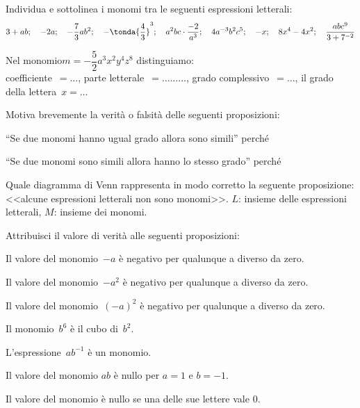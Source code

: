 \begin{esercizio}
\label{ese:9.8}
Individua e sottolinea i monomi tra le seguenti espressioni letterali:
\[3+ab;\quad -2a;\quad -\dfrac{7}{3}ab^2;\quad 
-\tonda{\dfrac{4}{3}}^{3};\quad a^{2}bc\cdot{\dfrac{-2}{a^{3}}};\quad 
4a^{-3}b^{2}c^{5};\quad -x;\quad 8x^{4}-4x^{2};\quad 
\dfrac{abc^{9}}{3+7^{-2}}\]
\end{esercizio}

\begin{esercizio}
\label{ese:9.9}
Nel monomio\quad \(m=-{\dfrac{5}{2}}a^{3}x^{2}y^{4}z^{8}\) distinguiamo:\\
coefficiente~\(=\ldots\),
parte letterale~\(=\ldots\ldots\ldots\),
grado complessivo~\(=\ldots\),
il grado della lettera~\(x=\ldots\)
\end{esercizio}

\begin{esercizio}
\label{ese:9.10}
Motiva brevemente la verità o falsità delle seguenti proposizioni:
\TabPositions{8.5cm}
\begin{enumeratea}
\item ``Se due monomi hanno ugual grado allora sono simili''
\hfill\verofalso\quad perché\dotfill
\item ``Se due monomi sono simili allora hanno lo stesso grado''
\hfill\verofalso\quad perché\dotfill
\end{enumeratea}
\end{esercizio}

\begin{esercizio}
\label{ese:9.11}
Quale diagramma di Venn rappresenta in modo corretto la seguente 
proposizione: 
<<alcune espressioni letterali non sono monomi>>.
\(L\): insieme delle espressioni letterali, \(M\): insieme dei monomi.\\

\noindent\hspace*{\fill}\esevenn\hspace*{\fill}
\end{esercizio}

\begin{esercizio}
\label{ese:9.12}
Attribuisci il valore di verità alle seguenti proposizioni:
\begin{enumeratea}
\spazielenx
\item Il valore del monomio~\(-a\) è negativo per qualunque a diverso da 
zero.\hfill\verofalso
\item Il valore del monomio~\(-a^{2}\) è negativo per qualunque a diverso 
da zero.\hfill\verofalso
\item Il valore del monomio~\((-a)^{2}\) è negativo per qualunque a diverso 
da zero.\hfill\verofalso
\item Il monomio~\(b^{6}\) è il cubo di~\(b^{2}\). \hfill\verofalso
\item L'espressione~\(ab^{-1}\) è un monomio. \hfill\verofalso
\item Il valore del monomio \(ab\) è nullo per
\(a = 1\) e \(b =-1\). \hfill\verofalso
\item Il valore del monomio è nullo se una delle sue lettere 
vale \(0\). \hfill\verofalso
\end{enumeratea}
\end{esercizio}


